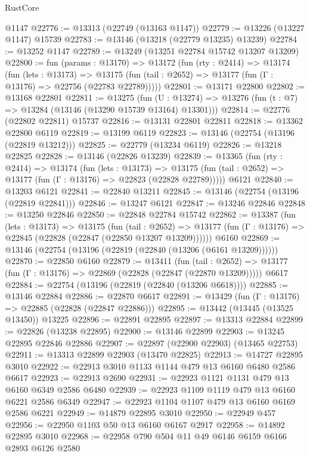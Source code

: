 \begin{lexlean}{RustCore}
\begin{coremodule}
    @1147
@22776 := @13313 (@22749 (@13163 @1147))
@22779 := @13226 (@13227 @1147) @15739
@22783 := @13146 (@13218 (@22779 @13235) @13239)
@22784 := @13252 @1147
@22789 := @13249 (@13251 @22784 @15742 @13207 @13209)
@22800 := fun (params : @13170) =>
  @13172
    (fun (rty : @2414) =>
    @13174
      (fun (lets : @13173) =>
      @13175 (fun (tail : @2652) => @13177 (fun (Γ : @13176) => @22756 (@22783 @22789)))))
@22801 := @13171 @22800
@22802 := @13168 @22801
@22811 := @13275
    (fun (U : @13274) => @13276 (fun (t : @7) => @13284 (@13146 (@13290 @15739 @13164) @13301)))
@22814 := @22776 (@22802 @22811) @15737
@22816 := @13131 @22801 @22811
@22818 := @13362 @22800 @6119
@22819 := @13199 @6119
@22823 := @13146 (@22754 (@13196 (@22819 @13212)))
@22825 := @22779 (@13234 @6119)
@22826 := @13218 @22825
@22828 := @13146 (@22826 @13239)
@22839 := @13365
    (fun (rty : @2414) =>
    @13174
      (fun (lets : @13173) =>
      @13175 (fun (tail : @2652) => @13177 (fun (Γ : @13176) => @22823 (@22828 @22789)))))
    @6121
@22840 := @13203 @6121
@22841 := @22840 @13211
@22845 := @13146 (@22754 (@13196 (@22819 @22841)))
@22846 := @13247 @6121
@22847 := @13246 @22846
@22848 := @13250 @22846
@22850 := @22848 @22784 @15742
@22862 := @13387
    (fun (lets : @13173) =>
    @13175
      (fun (tail : @2652) =>
      @13177 (fun (Γ : @13176) => @22845 (@22828 (@22847 (@22850 @13207 @13209))))))
    @6160
@22869 := @13146 (@22754 (@13196 (@22819 (@22840 (@13206 (@6161 @13209))))))
@22870 := @22850 @6160
@22879 := @13411
    (fun (tail : @2652) => @13177 (fun (Γ : @13176) => @22869 (@22828 (@22847 (@22870 @13209)))))
    @6617
@22884 := @22754 (@13196 (@22819 (@22840 (@13206 @6618))))
@22885 := @13146 @22884
@22886 := @22870 @6617
@22891 := @13429 (fun (Γ : @13176) => @22885 (@22828 (@22847 @22886)))
@22895 := @13442 (@13445 (@13525 @13450)) @13225
@22896 := @22891 @22895
@22897 := @13313 @22884
@22899 := @22826 (@13238 @22895)
@22900 := @13146 @22899
@22903 := @13245 @22895 @22846 @22886
@22907 := @22897 (@22900 @22903) (@13465 @22753)
@22911 := @13313 @22899 @22903 (@13470 @22825)
@22913 := @14727 @22895 @3010
@22922 := @22913 @3010 @1133 @1144 @479 @13 @6160 @6480 @2586 @6617
@22923 := @22913 @2690
@22931 := @22923 @1121 @1131 @479 @13 @6160 @6349 @2586 @6480
@22939 := @22923 @1109 @1119 @479 @13 @6160 @6221 @2586 @6349
@22947 := @22923 @1104 @1107 @479 @13 @6160 @6169 @2586 @6221
@22949 := @14879 @22895 @3010
@22950 := @22949 @457
@22956 := @22950 @1103 @50 @13 @6160 @6167 @2917
@22958 := @14892 @22895 @3010
@22968 := @22958 @790 @504 @11 @49 @6146 @6159 @6166 @2893 @6126 @2580

\end{coremodule}
\end{lexlean}
